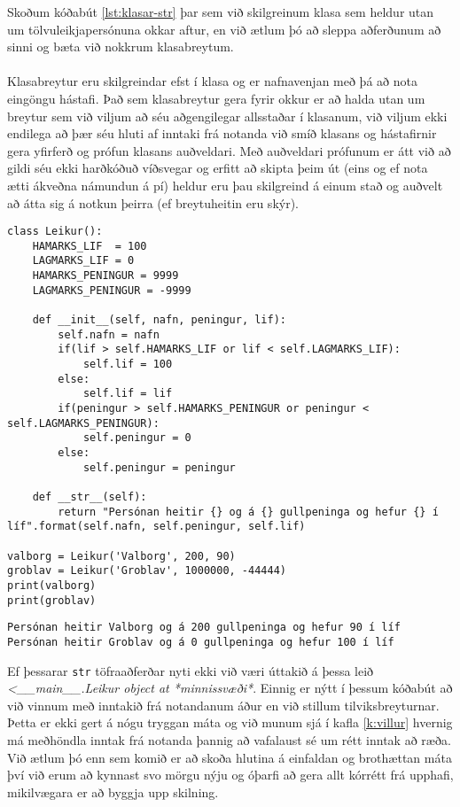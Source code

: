 Skoðum kóðabút \ref{lst:klasar-str} þar sem við skilgreinum klasa sem heldur utan um tölvuleikjapersónuna okkar aftur, en við ætlum þó að sleppa aðferðunum að sinni og bæta við nokkrum klasabreytum.
\paragraph{}

Klasabreytur eru skilgreindar efst í klasa og er nafnavenjan með þá að nota eingöngu hástafi.
Það sem klasabreytur gera fyrir okkur er að halda utan um breytur sem við viljum að séu aðgengilegar allsstaðar í klasanum, við viljum ekki endilega að þær séu hluti af inntaki frá notanda við smíð klasans og hástafirnir gera yfirferð og prófun klasans auðveldari.
Með auðveldari prófunum er átt við að gildi séu ekki harðkóðuð víðsvegar og erfitt að skipta þeim út (eins og ef nota ætti ákveðna námundun á pí) heldur eru þau skilgreind á einum stað og auðvelt að átta sig á notkun þeirra (ef breytuheitin eru skýr).

\begin{lstlisting}[caption=Töfraaðferðin \_\_str\_\_, label=lst:klasar-str]
class Leikur():
	HAMARKS_LIF  = 100
	LAGMARKS_LIF = 0
	HAMARKS_PENINGUR = 9999
	LAGMARKS_PENINGUR = -9999
	
	def __init__(self, nafn, peningur, lif):
		self.nafn = nafn
		if(lif > self.HAMARKS_LIF or lif < self.LAGMARKS_LIF):
			self.lif = 100
		else:
			self.lif = lif
		if(peningur > self.HAMARKS_PENINGUR or peningur < self.LAGMARKS_PENINGUR):
			self.peningur = 0
		else:
			self.peningur = peningur
		
	def __str__(self):
		return "Persónan heitir {} og á {} gullpeninga og hefur {} í líf".format(self.nafn, self.peningur, self.lif)

valborg = Leikur('Valborg', 200, 90)
groblav = Leikur('Groblav', 1000000, -44444)
print(valborg)
print(groblav)
\end{lstlisting}
\lstset{style=uttak}
\begin{lstlisting}
Persónan heitir Valborg og á 200 gullpeninga og hefur 90 í líf
Persónan heitir Groblav og á 0 gullpeninga og hefur 100 í líf
\end{lstlisting}
\lstset{style=venjulegt}

Ef þessarar \texttt{str} töfraaðferðar nyti ekki við væri úttakið á þessa leið \textit{<\_\_main\_\_.Leikur object at *minnissvæði*}.
Einnig er nýtt í þessum kóðabút að við vinnum með inntakið frá notandanum áður en við stillum tilviksbreyturnar.
Þetta er ekki gert á nógu tryggan máta og við munum sjá í kafla \ref{k:villur} hvernig má meðhöndla inntak frá notanda þannig að vafalaust sé um rétt inntak að ræða.
Við ætlum þó enn sem komið er að skoða hlutina á einfaldan og brothættan máta því við erum að kynnast svo mörgu nýju og óþarfi að gera allt kórrétt frá upphafi, mikilvægara er að byggja upp skilning.

